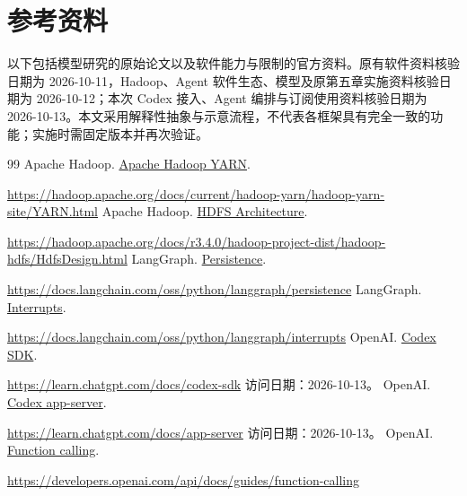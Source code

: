 \documentclass[11pt,a4paper]{article}
\begin{document}
\section*{参考资料}
以下包括模型研究的原始论文以及软件能力与限制的官方资料。原有软件资料核验日期为 2026-10-11，Hadoop、Agent 软件生态、模型及原第五章实施资料核验日期为 2026-10-12；本次 Codex 接入、Agent 编排与订阅使用资料核验日期为 2026-10-13。本文采用解释性抽象与示意流程，不代表各框架具有完全一致的功能；实施时需固定版本并再次验证。\par
\begingroup
\renewcommand{\section}[2]{}
\begin{thebibliography}{99}
\renewcommand{\baselinestretch}{1.0}
\fontsize{8.5pt}{10pt}\selectfont
\setlength{\itemsep}{0pt}
\setlength{\parskip}{0pt}
 Apache Hadoop. \href{https://hadoop.apache.org/docs/current/hadoop-yarn/hadoop-yarn-site/YARN.html}{Apache Hadoop YARN}.\par\url{https://hadoop.apache.org/docs/current/hadoop-yarn/hadoop-yarn-site/YARN.html}
 Apache Hadoop. \href{https://hadoop.apache.org/docs/r3.4.0/hadoop-project-dist/hadoop-hdfs/HdfsDesign.html}{HDFS Architecture}.\par\url{https://hadoop.apache.org/docs/r3.4.0/hadoop-project-dist/hadoop-hdfs/HdfsDesign.html}
 LangGraph. \href{https://docs.langchain.com/oss/python/langgraph/persistence}{Persistence}.\par\url{https://docs.langchain.com/oss/python/langgraph/persistence}
 LangGraph. \href{https://docs.langchain.com/oss/python/langgraph/interrupts}{Interrupts}.\par\url{https://docs.langchain.com/oss/python/langgraph/interrupts}
 OpenAI. \href{https://learn.chatgpt.com/docs/codex-sdk}{Codex SDK}.\par\url{https://learn.chatgpt.com/docs/codex-sdk} 访问日期：2026-10-13。
 OpenAI. \href{https://learn.chatgpt.com/docs/app-server}{Codex app-server}.\par\url{https://learn.chatgpt.com/docs/app-server} 访问日期：2026-10-13。
 OpenAI. \href{https://developers.openai.com/api/docs/guides/function-calling}{Function calling}.\par\url{https://developers.openai.com/api/docs/guides/function-calling}

\end{thebibliography}
\end{document}
